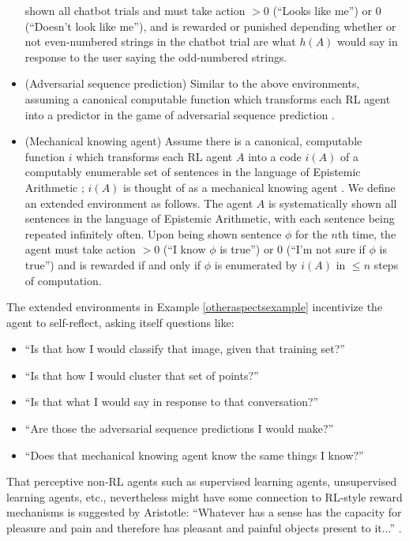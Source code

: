 \documentclass[runningheads]{llncs}
\begin{document}
\begin{example}
\begin{itemize}
        shown all chatbot trials and must take action $>0$ (``Looks like me'') or $0$
        (``Doesn't look like me''), and is rewarded or punished depending
        whether or not even-numbered strings in the chatbot trial are what $h(A)$ would
        say in response to the user saying the odd-numbered strings.
        \item
        (Adversarial sequence prediction) Similar to the above environments, assuming
        a canonical computable function which transforms each RL agent into a predictor
        in the game of adversarial sequence prediction \cite{hibbard2008adversarial}
        \cite{hibbard}.
        \item
        (Mechanical knowing agent) Assume there is a canonical, computable function
        $i$ which transforms each RL agent $A$ into a code $i(A)$ of a computably
        enumerable set of sentences in the language of Epistemic Arithmetic
        \cite{shapiro}; $i(A)$ is thought of as a mechanical knowing agent
        \cite{carlson}. We define an extended environment as follows. The agent $A$
        is systematically shown all sentences in the language of Epistemic Arithmetic,
        with each sentence being repeated infinitely often.
        Upon being shown sentence $\phi$ for the $n$th time, the agent must take action
        $>0$ (``I know $\phi$ is true'')
        or $0$ (``I'm not sure if $\phi$ is true'')
        and is rewarded if and only if $\phi$ is
        enumerated by $i(A)$ in $\leq n$ steps of computation.
    \end{itemize}
\end{example}

The extended environments in Example \ref{otheraspectsexample} incentivize the agent
to self-reflect, asking itself questions like:
\begin{itemize}
    \item
    ``Is that how I would
    classify that image, given that training set?''
    \item ``Is that how I would cluster that set of points?''
    \item ``Is that what I would say in response to that conversation?''
    \item ``Are those the adversarial sequence predictions I would make?''
    \item ``Does that mechanical knowing agent know the same things I know?''
\end{itemize}
That perceptive non-RL agents such as supervised learning agents, unsupervised learning agents,
etc., nevertheless might have some connection to RL-style reward mechanisms
is suggested by Aristotle:
``Whatever has a sense has the capacity for pleasure and pain and therefore has pleasant
and painful objects present to it...'' \cite{aristotlesoul}.
\end{document}
